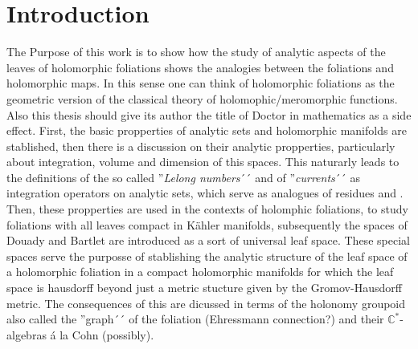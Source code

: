 \documentclass[12pt,twoside,a4paper]{report}
\newcommand{\co}{\ensuremath{\mathbb C }}
\begin{document}
\tableofcontents %
\listoffigures  %
\listoftables   %


\chapter{Introduction}
\pagestyle{fancy}
\fancyhf{}
\fancyhead[LE]{\rightmark}
\fancyhead[RO]{\leftmark}
\fancyfoot[C]{\thepage}
The Purpose of this work is to show how the study of analytic aspects of the leaves of holomorphic foliations shows the
analogies between the foliations and holomorphic maps. In this sense one can think of holomorphic foliations as the geometric
version of the classical theory of holomophic/meromorphic functions. Also this thesis should give its author the title of Doctor
in mathematics as a side effect.
First, the basic propperties of analytic sets and holomorphic manifolds are stablished, then there is a discussion on their
analytic propperties, particularly about integration, volume and dimension of this spaces. This naturarly leads to the
definitions of the so called ''\emph{Lelong numbers}´´ and of ''\emph{currents}´´ as integration operators on analytic sets,
which serve as analogues of residues and .
Then, these propperties are used in the contexts of holomphic foliations, to study foliations with all leaves compact in Kähler 
manifolds, subsequently the spaces of Douady and Bartlet are introduced as a sort of universal leaf space.
These special spaces serve the purposse of stablishing the analytic structure of the leaf space of a holomorphic foliation in
a compact holomorphic manifolds for which the leaf space is hausdorff beyond just a metric stucture given by the
Gromov-Hausdorff metric.
The consequences of this are dicussed in terms of the holonomy groupoid also called the ''graph´´ of the foliation
(Ehressmann connection?) and their $\co^{*}$-algebras á la Cohn (possibly).
\end{document}
